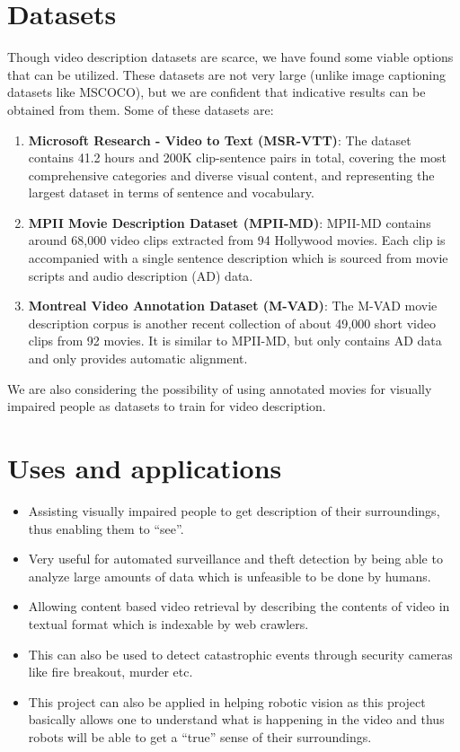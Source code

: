 \documentclass[11pt]{article}
\begin{document}
	\section{Datasets}
		Though video description datasets are scarce, we have found some viable options that can be utilized. These datasets are not very large (unlike image captioning datasets like MSCOCO), but we are confident that indicative results can be obtained from them. Some of these datasets are:
		\begin{enumerate}
		\item
			\textbf{Microsoft Research - Video to Text (MSR-VTT)}: The dataset contains 41.2 hours and 200K clip-sentence pairs in total, covering the most comprehensive categories and diverse visual content, and representing the largest dataset in terms of sentence and vocabulary.
		\item
			\textbf{MPII Movie Description Dataset (MPII-MD)}: MPII-MD contains around 68,000 video clips extracted from 94 Hollywood movies. Each clip is accompanied with a single sentence description which is sourced from movie scripts and audio description (AD) data.
		\item
			\textbf{Montreal Video Annotation Dataset (M-VAD)}: The M-VAD movie description corpus is another recent collection of about 49,000 short video clips from 92 movies. It is similar to MPII-MD, but only contains AD data and only provides automatic alignment.
		\end{enumerate}
		We are also considering the possibility of using annotated movies for visually impaired people as datasets to train for video description.

	\section{Uses and applications}
			\begin{itemize}
				\item
					Assisting visually impaired people to get description of their surroundings, thus enabling them to ``see''.
				\item
					Very useful for automated surveillance and theft detection by being able to analyze large amounts of data which is unfeasible to be done by humans.
				\item
					Allowing content based video retrieval by describing the contents of video in textual format which is indexable by web crawlers.
				\item
					This can also be used to detect catastrophic events through security cameras like fire breakout, murder etc.
				\item
					This project can also be applied in helping robotic vision as this project basically allows one to understand what is happening in the video and thus robots will be able to get a ``true'' sense of their surroundings.
			\end{itemize}
\end{document}
